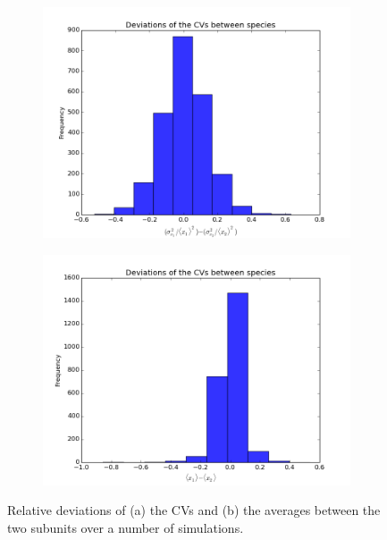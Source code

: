 \documentclass[a4paper,12pt]{article}
\begin{document}
\begin{figure}[!ht]
        \centering
        \begin{subfigure}[!ht]{0.7\textwidth}
                \includegraphics[width=\textwidth]{images/vars_devs}
                \caption{}
                \label{fig:devs_vars}
        \end{subfigure}%
        
        \begin{subfigure}[b]{0.7\textwidth}
                \includegraphics[width=\textwidth]{images/avgs_devs}
                \caption{}
                \label{fig:devs_avgs}
        \end{subfigure}
        
\caption{Relative deviations of (a) the CVs and (b) the averages between the two subunits over a number of simulations.}
\label{fig:dev_hist}
\end{figure}
\end{document}
